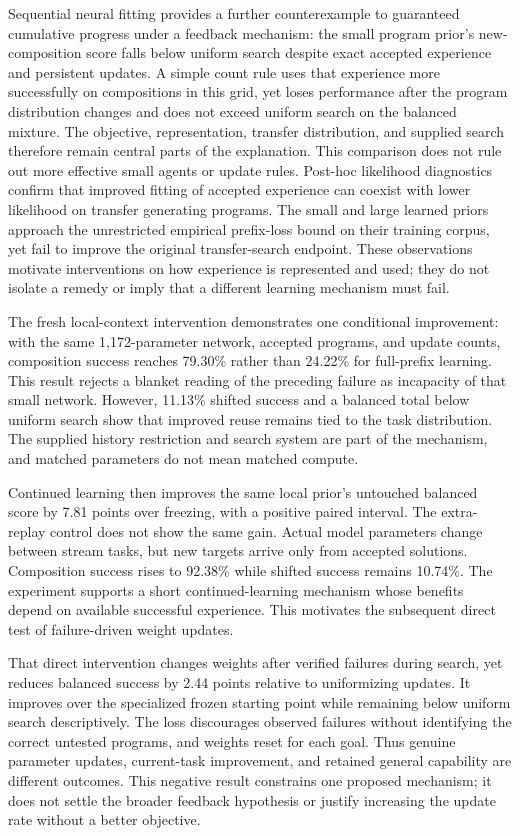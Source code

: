 \documentclass[11pt]{article}
\begin{document}
Sequential neural fitting provides a further counterexample to guaranteed
cumulative progress under a feedback mechanism: the small program prior's
new-composition score falls below uniform search despite exact accepted
experience and persistent updates. A simple count rule uses that experience
more successfully on compositions in this grid, yet loses performance after
the program distribution changes and does not exceed uniform search on the
balanced mixture. The objective, representation, transfer distribution, and
supplied search therefore remain central parts of the explanation. This
comparison does not rule out more effective small agents or update rules.
Post-hoc likelihood diagnostics confirm that improved fitting of accepted
experience can coexist with lower likelihood on transfer generating programs.
The small and large learned priors approach the unrestricted empirical
prefix-loss bound on their training corpus, yet fail to improve the original
transfer-search endpoint. These observations motivate interventions on how
experience is represented and used; they do not isolate a remedy or imply
that a different learning mechanism must fail.

The fresh local-context intervention demonstrates one conditional improvement:
with the same 1,172-parameter network, accepted programs, and update counts,
composition success reaches 79.30\% rather than 24.22\% for full-prefix
learning. This result rejects a blanket reading of the preceding failure as
incapacity of that small network. However, 11.13\% shifted success and a
balanced total below uniform search show that improved reuse remains tied
to the task distribution. The supplied history restriction and search system
are part of the mechanism, and matched parameters do not mean matched compute.

Continued learning then improves the same local prior's untouched balanced
score by 7.81 points over freezing, with a positive paired interval. The
extra-replay control does not show the same gain. Actual model parameters
change between stream tasks, but new targets arrive only from accepted
solutions. Composition success rises to 92.38\% while shifted success remains
10.74\%. The experiment supports a short continued-learning mechanism whose
benefits depend on available successful experience. This motivates the
subsequent direct test of failure-driven weight updates.

That direct intervention changes weights after verified failures during
search, yet reduces balanced success by 2.44 points relative to uniformizing
updates. It improves over the specialized frozen starting point while
remaining below uniform search descriptively. The loss discourages observed
failures without identifying the correct untested programs, and weights reset
for each goal. Thus genuine parameter updates, current-task improvement, and
retained general capability are different outcomes. This negative result
constrains one proposed mechanism; it does not settle the broader feedback
hypothesis or justify increasing the update rate without a better objective.
\end{document}
